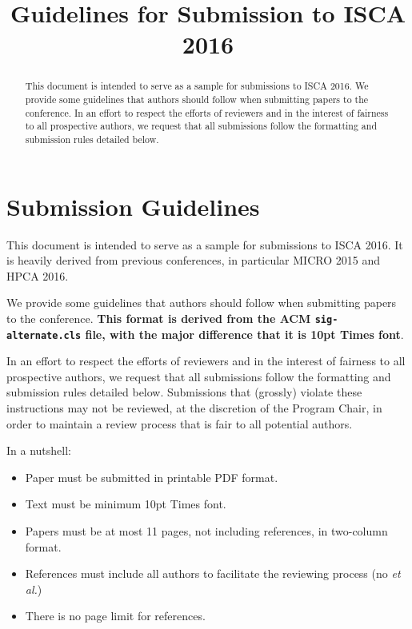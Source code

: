 \documentclass{sig-alternate}
\title{Guidelines for Submission to ISCA 2016}
\author{}
\begin{document}
\maketitle
\thispagestyle{firstpage}
\pagestyle{plain}

\begin{abstract}

This document is intended to serve as a sample for submissions to ISCA 2016. We provide some guidelines that authors should follow when submitting papers to the conference. In an effort to respect the efforts of reviewers and in the interest of fairness to all prospective authors, we request that all submissions follow the formatting and submission rules detailed below. 

\end{abstract}

\section{Submission Guidelines}

This document is intended to serve as a sample for submissions to ISCA 2016. It is heavily derived from previous conferences, in particular MICRO 2015 and HPCA 2016.

We provide some guidelines that authors should follow when submitting papers to the conference. \textbf{This format is derived from the ACM \texttt{sig-alternate.cls} file, with the major difference that it is 10pt Times font}.

In an effort to respect the efforts of reviewers and in the interest of fairness to all prospective authors, we request that all submissions follow the formatting and submission rules detailed below. Submissions that (grossly) violate these instructions may not be reviewed, at the discretion of the Program Chair, in order to maintain a review process that is fair to all potential authors.

\vspace{1ex}In a nutshell:

\begin{itemize}
\item Paper must be submitted in printable PDF format.
\item Text must be minimum 10pt Times font.
\item Papers must be at most 11 pages, not including references, in two-column format.
\item References must include all authors to facilitate the reviewing process (no \emph{et al.})
\item There is no page limit for references.
\end{itemize}
\end{document}

